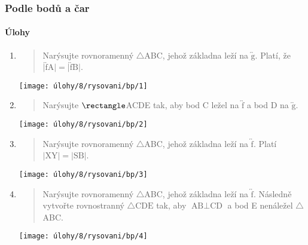 \newpage

\subsubsection{Podle bodů a čar}

\paragraph{Úlohy}
\begin{enumerate}
    \item
    \begin{minipage}[t]{\linewidth}
        \begin{quote}
            Narýsujte rovnoramenný $\triangle$ABC, jehož základna leží na $\overleftrightarrow{\text{g}}$.
            Platí, že $\lvert \overleftrightarrow{\text{f}} \text{A} \rvert = \lvert \overleftrightarrow{\text{f}} \text{B} \rvert$.
        \end{quote}
        \centering
        \texttt{[image: úlohy/8/rysovani/bp/1]}

    \end{minipage}

    \item
    \begin{minipage}[t]{\linewidth}
        \begin{quote}
            Narýsujte $\rectangle$ACDE tak, aby bod C ležel na $\overleftrightarrow{\text{f}}$ a bod D na $\overleftrightarrow{\text{g}}$.
        \end{quote}
        \centering
        \texttt{[image: úlohy/8/rysovani/bp/2]}

    \end{minipage}

    \item
    \begin{minipage}[t]{\linewidth}
        \begin{quote}
            Narýsujte rovnoramenný $\triangle$ABC, jehož základna leží na $\overleftrightarrow{\text{f}}$.
            Platí $\lvert \text{XY} \rvert = \lvert \text{SB} \rvert$.
        \end{quote}
        \centering
        \texttt{[image: úlohy/8/rysovani/bp/3]}

    \end{minipage}

    \item
    \begin{minipage}[t]{\linewidth}
        \begin{quote}
            Narýsujte rovnoramenný $\triangle$ABC, jehož základna leží na $\overleftrightarrow{\text{f}}$.
            Následně vytvořte rovnostranný $\triangle{\text{CDE}}$ tak, aby $\text{AB} \perp \text{CD}$ a bod E nenáležel $\triangle$ABC\@.
        \end{quote}
        \centering
        \texttt{[image: úlohy/8/rysovani/bp/4]}


\end{minipage}
\end{enumerate}
